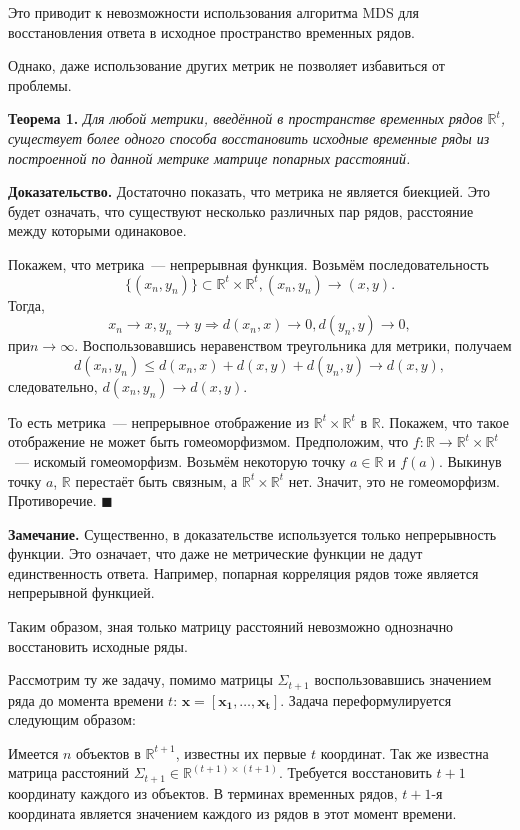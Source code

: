 \documentclass{article}
\begin{document}
Это приводит к невозможности использования алгоритма MDS для восстановления ответа в исходное пространство временных рядов.

Однако, даже использование других метрик не позволяет избавиться от проблемы.

\textbf{Теорема 1.} \textit{Для любой метрики, введённой в пространстве временных рядов $\mathbb{R}^t$, существует более одного способа восстановить исходные временные ряды из построенной по данной метрике матрице попарных расстояний.}

\textbf{Доказательство.} Достаточно показать, что метрика не является биекцией. Это будет означать, что существуют несколько различных пар рядов, расстояние между которыми одинаковое.

Покажем, что метрика~--- непрерывная функция. Возьмём последовательность \[\{(x_n, y_n)\} \subset \mathbb{R}^t \times \mathbb{R}^t, (x_n, y_n) \to (x, y).\] Тогда, \[x_n\to x, y_n\to y \Rightarrow d(x_n,x)\to 0 ,d(y_n,y)\to 0,\] $при n \to \infty.$ Воспользовавшись неравенством треугольника для метрики, получаем \[d(x_n,y_n)\leq d(x_n,x)+d(x,y)+d(y_n,y)\to d(x,y),\] следовательно, $d(x_n,y_n)\to d(x,y)$.

То есть метрика~--- непрерывное отображение из $\mathbb{R}^t \times \mathbb{R}^t$ в $\mathbb{R}$. Покажем, что такое отображение не может быть гомеоморфизмом. Предположим, что $f: \mathbb{R} \to \mathbb{R}^t \times \mathbb{R}^t$~--- искомый гомеоморфизм. Возьмём некоторую точку $a \in \mathbb{R}$ и $f(a)$. Выкинув точку $a$, $\mathbb{R}$ перестаёт быть связным, а $\mathbb{R}^t \times \mathbb{R}^t$ нет. Значит, это не гомеоморфизм. Противоречие.
$\blacksquare$

\textbf{Замечание.} Существенно, в доказательстве используется только непрерывность функции. Это означает, что даже не метрические функции не дадут единственность ответа. Например, попарная корреляция рядов тоже является непрерывной функцией.

Таким образом, зная только матрицу расстояний невозможно однозначно восстановить исходные ряды.

Рассмотрим ту же задачу, помимо матрицы $\Sigma_{t+1}$ воспользовавшись значением ряда до момента времени $t$: $\mathbf{x}=[\mathbf{x_1}, \ldots, \mathbf{x_{t}}]$. Задача переформулируется следующим образом:

Имеется $n$ объектов в $\mathbb{R}^{t+1}$, известны их первые $t$ координат. Так же известна матрица расстояний $\Sigma_{t+1} \in \mathbb{R}^{(t+1) \times (t+1)}$. Требуется восстановить $t+1$ координату каждого из объектов. В терминах временных рядов, $t+1$-я координата является значением каждого из рядов в этот момент времени.
\end{document}
